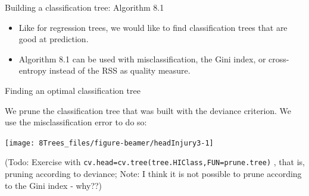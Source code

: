 \documentclass[10pt,ignorenonframetext,]{beamer}
\newenvironment{Shaded}{\begin{snugshade}}{\end{snugshade}}
\newcommand{\KeywordTok}[1]{\textcolor[rgb]{0.13,0.29,0.53}{\textbf{#1}}}
\newcommand{\DataTypeTok}[1]{\textcolor[rgb]{0.13,0.29,0.53}{#1}}
\newcommand{\DecValTok}[1]{\textcolor[rgb]{0.00,0.00,0.81}{#1}}
\newcommand{\StringTok}[1]{\textcolor[rgb]{0.31,0.60,0.02}{#1}}
\newcommand{\OperatorTok}[1]{\textcolor[rgb]{0.81,0.36,0.00}{\textbf{#1}}}
\newcommand{\NormalTok}[1]{#1}
\begin{document}
\begin{frame}

\begin{block}{Building a classification tree: Algorithm 8.1}

\vspace{2mm}

\begin{itemize}
\item
  Like for regression trees, we would like to find classification trees
  that are good at prediction.
\item
  Algorithm 8.1 can be used with misclassification, the Gini index, or
  cross-entropy instead of the RSS as quality measure.
\end{itemize}

\end{block}

\end{frame}

\begin{frame}[fragile]

\begin{block}{Finding an optimal classification tree}

We prune the classification tree that was built with the deviance
criterion. We use the misclassification error to do so:

\scriptsize

\begin{Shaded}
\end{Shaded}

\begin{center}\texttt{[image: 8Trees\_files/figure-beamer/headInjury3-1]} \end{center}

\tiny
(Todo: Exercise with
\texttt{cv.head=cv.tree(tree.HIClass,FUN=prune.tree)} , that is, pruning
according to deviance; Note: I think it is not possible to prune
according to the Gini index - why??)

\end{block}

\end{frame}
\end{document}

